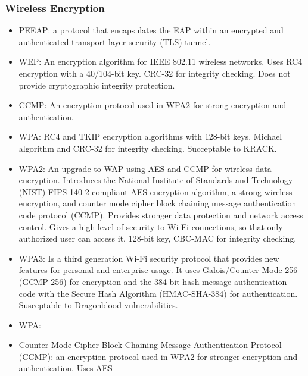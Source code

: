 \subsubsection{Wireless Encryption}
\begin{itemize}
    \item PEEAP: a protocol that encapsulates the EAP within an encrypted and authenticated transport layer security (TLS) tunnel.
    \item WEP: An encryption algorithm for IEEE 802.11 wireless networks. Uses RC4 encryption with a 40/104-bit key. CRC-32 for integrity checking. Does not provide cryptographic integrity protection.
    \item CCMP: An encryption protocol used in WPA2 for strong encryption and authentication.
    \item WPA: RC4 and TKIP encryption algorithms with 128-bit keys. Michael algorithm and CRC-32 for integrity checking. Succeptable to KRACK.
    \item WPA2: An upgrade to WAP using AES and CCMP for wireless data encryption. Introduces the National Institute of Standards and Technology (NIST) FIPS 140-2-compliant AES encryption algorithm, a strong wireless encryption, and counter mode cipher block chaining message authentication code protocol (CCMP). Provides stronger data protection and network access control. Gives a high level of security to Wi-Fi connections, so that only authorized user can access it. 128-bit key, CBC-MAC for integrity checking.
    \item WPA3: Is a third generation Wi-Fi security protocol that provides new features for personal and enterprise usage. It uses Galois/Counter Mode-256 (GCMP-256) for encryption and the 384-bit hash message authentication code with the Secure Hash Algorithm (HMAC-SHA-384) for authentication. Susceptable to Dragonblood vulnerabilities.
    \item WPA: 
    \item Counter Mode Cipher Block Chaining Message Authentication Protocol (CCMP): an encryption protocol used in WPA2 for stronger encryption and authentication. Uses AES
\end{itemize}
